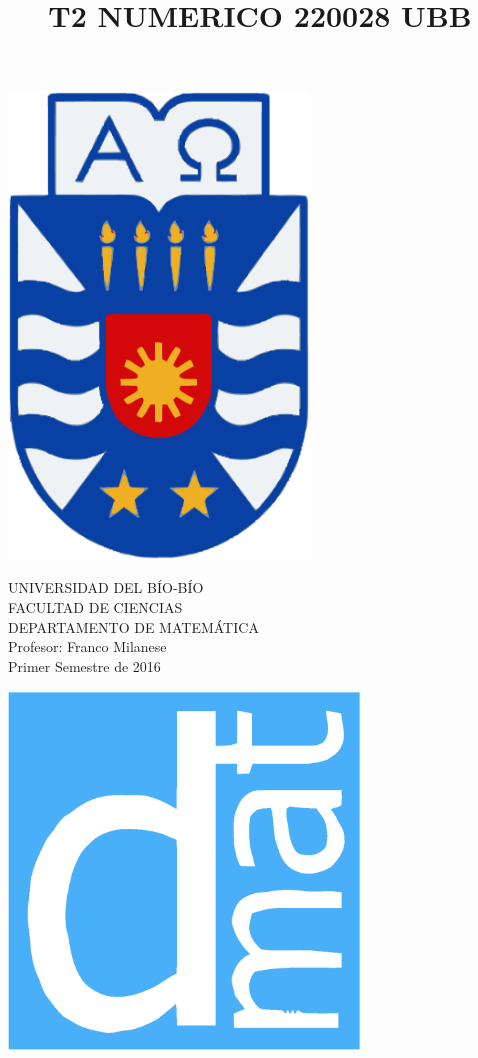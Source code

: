 \documentclass[11pt]{article}
\begin{document}
\title{T2 NUMERICO 220028 UBB}

{\begin{minipage}{2cm}
\hspace*{1cm}\includegraphics[width=0.6\textwidth]{escubo-ubb.eps}
\end{minipage}
\begin{minipage}{12cm}
\small
{\bf \rm 
{
\begin{center}
{\footnotesize UNIVERSIDAD DEL B\'IO-B\'IO} \\
{\scriptsize FACULTAD DE CIENCIAS}  \\
{\scriptsize DEPARTAMENTO DE MATEM\'ATICA}  \\
{\scriptsize Profesor:  Franco Milanese}\\
{\scriptsize Primer Semestre de 2016}
\end{center}
}}
\end{minipage}}
{\begin{minipage}{2cm}
\hspace*{-0.5cm}\vspace*{-0.05cm}\includegraphics[width=0.7\textwidth]{escudo-dmat.eps}
\end{minipage}}
\end{document}

